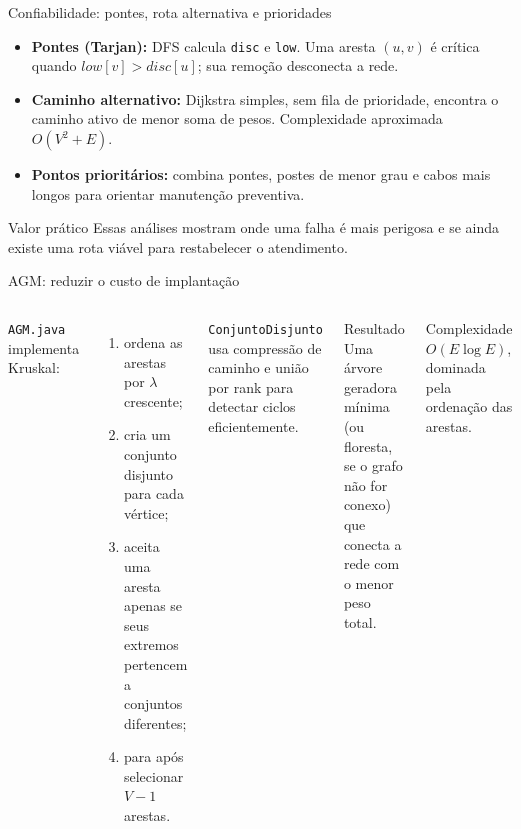 \documentclass[aspectratio=169,10pt]{beamer}
\begin{document}
\begin{frame}{Confiabilidade: pontes, rota alternativa e prioridades}
\begin{itemize}
  \item \textbf{Pontes (Tarjan):} DFS calcula \texttt{disc} e \texttt{low}. Uma aresta $(u,v)$ é crítica quando $low[v] > disc[u]$; sua remoção desconecta a rede.
  \item \textbf{Caminho alternativo:} Dijkstra simples, sem fila de prioridade, encontra o caminho ativo de menor soma de pesos. Complexidade aproximada $O(V^2+E)$.
  \item \textbf{Pontos prioritários:} combina pontes, postes de menor grau e cabos mais longos para orientar manutenção preventiva.
\end{itemize}
\begin{alertblock}{Valor prático}
  Essas análises mostram onde uma falha é mais perigosa e se ainda existe uma rota viável para restabelecer o atendimento.
\end{alertblock}
\end{frame}

\begin{frame}{AGM: reduzir o custo de implantação}
\begin{columns}[T]
  \texttt{AGM.java} implementa Kruskal:
  \begin{enumerate}
    \item ordena as arestas por $\lambda$ crescente;
    \item cria um conjunto disjunto para cada vértice;
    \item aceita uma aresta apenas se seus extremos pertencem a conjuntos diferentes;
    \item para após selecionar $V-1$ arestas.
  \end{enumerate}
  \vspace{0.15cm}
  \texttt{ConjuntoDisjunto} usa compressão de caminho e união por rank para detectar ciclos eficientemente.
  \begin{block}{Resultado}
    Uma árvore geradora mínima (ou floresta, se o grafo não for conexo) que conecta a rede com o menor peso total.
  \end{block}
  \begin{block}{Complexidade}
    $O(E\log E)$, dominada pela ordenação das arestas.
  \end{block}
\end{columns}
\end{frame}
\end{document}
